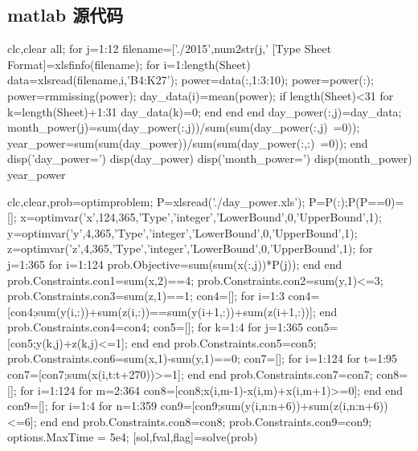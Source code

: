 \documentclass[withoutpreface,bwprint]{cumcmthesis} %
\begin{document}

\newpage%
\begin{appendices}		
	\section{matlab 源代码}
	\begin{matlab}
	clc,clear all;
	for j=1:12
		filename=['./2015',num2str(j,'%
		[Type Sheet Format]=xlsfinfo(filename);
		for i=1:length(Sheet)
			data=xlsread(filename,i,'B4:K27');
			power=data(:,1:3:10);%
			power=power(:);%
			power=rmmissing(power);%
			day_data(i)=mean(power);
			if
				length(Sheet)<31
				for k=length(Sheet)+1:31
					day_data(k)=0;
				end
			end
		end
		day_power(:,j)=day_data;
		month_power(j)=sum(day_power(:,j))/sum(sum(day_power(:,j)~=0));
		year_power=sum(sum(day_power))/sum(sum(day_power(:,:)~=0));
	end
	disp('day_power=')
	disp(day_power)
	disp('month_power=')
	disp(month_power)
	year_power
	\end{matlab}
	\begin{matlab}
	clc,clear,prob=optimproblem;
	P=xlsread('./day_power.xls');
	P=P(:);P(P==0)=[];%
	x=optimvar('x',124,365,'Type','integer','LowerBound',0,'UpperBound',1);
	y=optimvar('y',4,365,'Type','integer','LowerBound',0,'UpperBound',1);
	z=optimvar('z',4,365,'Type','integer','LowerBound',0,'UpperBound',1);
	for j=1:365
		for i=1:124
			prob.Objective=sum(sum(x(:,j))*P(j));
		end
	end
	prob.Constraints.con1=sum(x,2)==4;
	prob.Constraints.con2=sum(y,1)<=3;
	prob.Constraints.con3=sum(z,1)==1;
	con4=[];
	for i=1:3
		con4=[con4;sum(y(i,:))+sum(z(i,:))==sum(y(i+1,:))+sum(z(i+1,:))];
	end
	prob.Constraints.con4=con4;
	con5=[];
	for k=1:4
		for j=1:365
			con5=[con5;y(k,j)+z(k,j)<=1];
		end
	end
	prob.Constraints.con5=con5;
	prob.Constraints.con6=sum(x,1)-sum(y,1)==0;
	con7=[];
	for i=1:124
		for t=1:95
			con7=[con7;sum(x(i,t:t+270))>=1];
		end
	end
	prob.Constraints.con7=con7;
	con8=[];
	for i=1:124
		for m=2:364
			con8=[con8;x(i,m-1)-x(i,m)+x(i,m+1)>=0];
		end
	end
	con9=[];
	for i=1:4
		for n=1:359
			con9=[con9;sum(y(i,n:n+6))+sum(z(i,n:n+6))<=6];
		end
	end
	prob.Constraints.con8=con8;
	prob.Constraints.con9=con9;
	options.MaxTime = 5e4;
	[sol,fval,flag]=solve(prob)
	\end{matlab}





\end{appendices}
\end{document}
